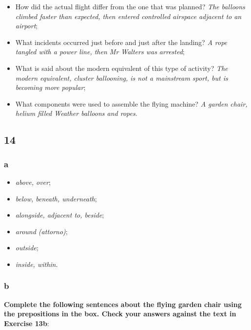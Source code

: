 \begin{itemize}

\item How did the actual flight differ from the one that was planned? \textit{The balloons climbed faster than expected, then entered controlled airspace adjacent to an airport};

\item What incidents occurred just before and just after the landing? \textit{A rope tangled with a power line, then Mr Walters was arrested};

\item What is said about the modern equivalent of this type of activity? \textit{The modern equivalent, cluster ballooning, is not a mainstream sport, but is becoming more popular};

\item What components were used to assemble the flying machine? \textit{A garden chair, helium filled Weather balloons and ropes}.

\end{itemize}

\subsection{14}

\subsubsection{a}

\begin{itemize}

\item\textit{above, over};
\item\textit{below, beneath, underneath};
\item\textit{alongside, adjacent to, beside};
\item\textit{around (attorno)};
\item\textit{outside};
\item\textit{inside, within}.

\end{itemize}

\subsubsection{b}

\textbf{Complete the following sentences about the flying garden chair using the prepositions in the box. Check your answers against the text in Exercise 13b}:


